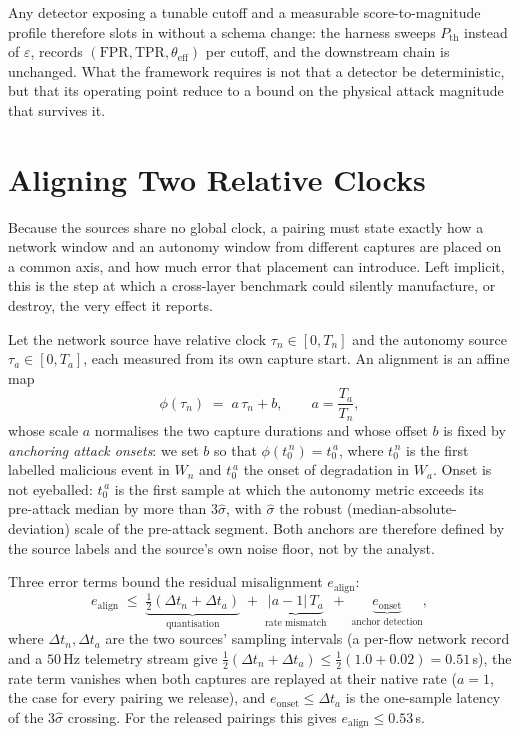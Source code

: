 Any detector exposing a tunable cutoff and a measurable score-to-magnitude
profile therefore slots in without a schema change: the harness sweeps
$P_{\mathrm{th}}$ instead of $\varepsilon$, records
$(\mathrm{FPR},\mathrm{TPR},\theta_{\mathrm{eff}})$ per cutoff, and the
downstream chain is unchanged. What the framework requires is not that a
detector be deterministic, but that its operating point reduce to a bound on the
physical attack magnitude that survives it.

\section{Aligning Two Relative Clocks}
\label{app:alignment}
Because the sources share no global clock, a  pairing
must state exactly how a network window and an autonomy window from different
captures are placed on a common axis, and how much error that placement can
introduce. Left implicit, this is the step at which a cross-layer benchmark
could silently manufacture, or destroy, the very effect it reports.

Let the network source have relative clock $\tau_n\in[0,T_n]$ and the autonomy
source $\tau_a\in[0,T_a]$, each measured from its own capture start. An
alignment is an affine map
\begin{equation}
\label{eq:align}
\phi(\tau_n) \;=\; a\,\tau_n + b, \qquad a=\frac{T_a}{T_n},
\end{equation}
whose scale $a$ normalises the two capture durations and whose offset $b$ is
fixed by \emph{anchoring attack onsets}: we set $b$ so that
$\phi(t_0^{\,n}) = t_0^{\,a}$, where $t_0^{\,n}$ is the first labelled malicious
event in $W_n$ and $t_0^{\,a}$ the onset of degradation in $W_a$. Onset is not
eyeballed: $t_0^{\,a}$ is the first sample at which the autonomy metric exceeds
its pre-attack median by more than $3\hat\sigma$, with $\hat\sigma$ the robust
(median-absolute-deviation) scale of the pre-attack segment. Both anchors are
therefore defined by the source labels and the source's own noise floor, not by
the analyst.

Three error terms bound the residual misalignment $e_{\mathrm{align}}$:
\begin{equation}
\label{eq:align_err}
e_{\mathrm{align}} \;\le\; \underbrace{\tfrac{1}{2}(\Delta t_n+\Delta t_a)}_{\text{quantisation}}
\;+\;\underbrace{|a-1|\,T_a}_{\text{rate mismatch}}
\;+\;\underbrace{e_{\mathrm{onset}}}_{\text{anchor detection}},
\end{equation}
where $\Delta t_n,\Delta t_a$ are the two sources' sampling intervals (a per-flow
network record and a $50$\,Hz telemetry stream give
$\tfrac12(\Delta t_n+\Delta t_a)\le\tfrac12(1.0+0.02)=0.51$\,s), the rate term
vanishes when both captures are replayed at their native rate ($a=1$, the case
for every pairing we release), and $e_{\mathrm{onset}}\le\Delta t_a$ is the
one-sample latency of the $3\hat\sigma$ crossing. For the released
 pairings this gives
$e_{\mathrm{align}}\le0.53$\,s.

